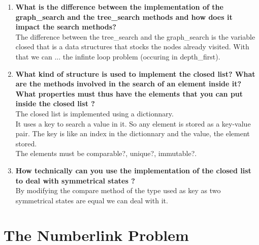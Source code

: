 \documentclass[10pt,a4paper]{article}
\begin{document}
\begin{enumerate}
	
	\item \textbf{What is the difference between the implementation of the graph\_search and the tree\_search methods and how does it impact the search methods?}\\
	
	The difference between the tree\_search and the graph\_search is the variable closed that is a data structures that stocks the nodes already visited. With that we can ... the infinte loop problem (occuring in depth\_first). 
	
	\item \textbf{What kind of structure is used to implement the closed list? What are the methods involved in the search of an element inside it? What properties must thus have the elements that you can put inside the closed list ?} \\
	
	The closed list is implemented using a dictionnary.\\
	It uses a key to search a value in it. So any element is stored as a key-value pair. The key is like an index in the dictionnary and the value, the element stored.\\
	The elements must be comparable?, unique?, immutable?.
	
	\item \textbf{How technically can you use the implementation of the closed list to deal with symmetrical states ? }\\
	
	By modifying the compare method of the type used as key as two symmetrical states are equal we can deal with it.
		
\end{enumerate}

\section{The Numberlink Problem}
\end{document}
